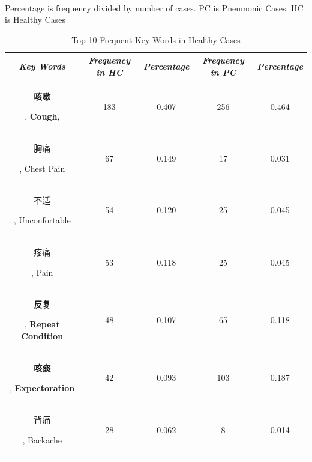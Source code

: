 \documentclass[journal]{IEEEtran}
\begin{document}
\begin{table}[htb]
\begin{center}
\begin{tabular}{|c|c|c|c|c|}
    \hline
    \end{tabular}
    \vspace{0.1cm}
    \label{frequency1}\\
    \footnotesize{Percentage is frequency divided by number of cases. PC is Pneumonic Cases. HC is Healthy Cases}

    \end{center}
    \vspace{-0.0cm}
    \end{table}

    \begin{table}[htb]
        \vspace{-0cm}
        \caption{Top 10 Frequent Key Words in Healthy Cases}
        \vspace{-0cm}
        \begin{center}
        \begin{tabular}{|c|c|c|c|c|}
            \hline
            \textbf{\textit{Key Words}} & \textbf{\textit{Frequency in HC}} & \textbf{\textit{Percentage}}& \textbf{\textit{Frequency in PC}}& \textbf{\textit{Percentage}} \\
        \hline
        \begin{CJK}{UTF8}{gbsn}\textbf{咳嗽}\end{CJK}, \textbf{Cough},  & 183 & 0.407 & 256 & 0.464\\
        \begin{CJK}{UTF8}{gbsn}胸痛\end{CJK}, Chest Pain & 67 & 0.149 & 17 & 0.031\\
        \begin{CJK}{UTF8}{gbsn}不适\end{CJK}, Unconfortable & 54 & 0.120 & 25 & 0.045\\
        \begin{CJK}{UTF8}{gbsn}疼痛\end{CJK}, Pain & 53 & 0.118 & 25 & 0.045\\
        \begin{CJK}{UTF8}{gbsn}\textbf{反复}\end{CJK}, \textbf{Repeat Condition} & 48 & 0.107 & 65 & 0.118\\
        \begin{CJK}{UTF8}{gbsn}\textbf{咳痰}\end{CJK}, \textbf{Expectoration} & 42 & 0.093 & 103 & 0.187\\
        \begin{CJK}{UTF8}{gbsn}背痛\end{CJK}, Backache & 28 & 0.062 & 8 & 0.014\\

\end{tabular}
\end{center}
\end{table}
\end{document}
